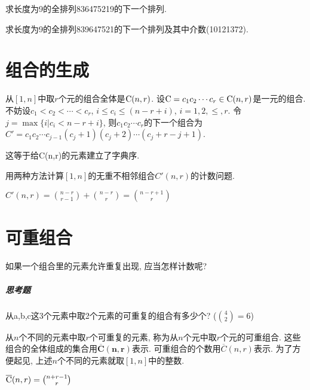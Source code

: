         \begin{example}
            求长度为9的全排列836475219的下一个排列.
        \end{example}

        \begin{example}
            求长度为9的全排列839647521的下一个排列及其中介数(10121372). 
        \end{example}
    
\section{组合的生成}

    \begin{algorithm}
        [求一个组合的下一个组合的算法]
        从$[1,n]$中取$r$个元的组合全体是$\mathrm{C}(n,r)$. 设$\mathrm{C}=c_1c_2\cdots c_r\in\mathrm{C}(n,r)$是一元的组合. 不妨设$c_1<c_2<\cdots<c_r$, $i\leqslant c_i\leqslant(n-r+i)$, $i=1,2,\leqslant,r$. 令$j=\max\{i|c_i<n-r+i\}$, 则$c_1c_2\cdots c_r$的下一个组合为$C'=c_1c_2\cdots c_{j-1}(c_j+1)(c_j+2)\cdots(c_j+r-j+1)$.
        \begin{note}
            这等于给C(n,r)的元素建立了字典序.
        \end{note}
    \end{algorithm}

    \begin{example}
        用两种方法计算$[1,n]$的无重不相邻组合$C'(n,r)$的计数问题.

        $C'(n,r)={n-r\choose r-1}+{n-r\choose r}={n-r+1\choose r}$
    \end{example}

\section{可重组合}

    如果一个组合里的元素允许重复出现, 应当怎样计数呢?

    \subparagraph{思考题}
        从a,b,c这3个元素中取2个元素的可重复的组合有多少个? (${4\choose2}=6$)

    \begin{definition}
        [可重组合]
        从$n$个不同的元素中取$r$个可重复的元素, 称为从$n$个元中取$r$个元的\textsf{可重组合}. 这些组合的全体组成的集合用$\mathbf{\overline{C}(n,r)}$表示. 可重组合的个数用$\overline C(n,r)$表示. 为了方便起见, 上述$n$个不同的元素就取$[1,n]$中的整数. 
    \end{definition}

    \begin{theorem}
        $\overline {\mathrm{C}}(n,r)={n+r-1\choose r}$
    \end{theorem}

